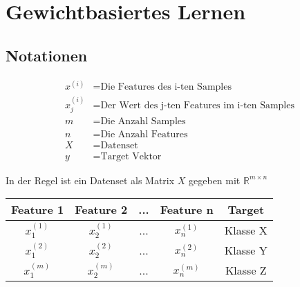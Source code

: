 \newpage
\section{Gewichtbasiertes Lernen}
\subsection{Notationen}
\begin{flushleft}

\begin{align*}
x^{(i)} &= \text{Die Features des i-ten Samples} \\
x_{j}^{(i)} &= \text{Der Wert des j-ten Features im i-ten Samples} \\
m &= \text{Die Anzahl Samples} \\
n &= \text{Die Anzahl Features} \\
X &= \text{Datenset} \\
y &= \text{Target Vektor}
\end{align*}

In der Regel ist ein Datenset als Matrix $X$ gegeben mit $\mathbb{R}^{m \times n}$


\begin{center}
	\begin{table}[h]
	\begin{tabular}{|c|c|c|c|c|}
		\hline
		\textbf{Feature 1} & \textbf{Feature 2} & \textbf{...} & \textbf{Feature n} & \textbf{Target} \\ 
		\hline
		$x_{1}^{(1)}$ & $x_{2}^{(1)}$ & ... & $x_{n}^{(1)}$ & Klasse X  \\ 
		\hline
		$x_{1}^{(2)}$ & $x_{2}^{(2)}$ & ... & $x_{n}^{(2)}$ & Klasse Y  \\ 
		\hline
		$x_{1}^{(m)}$ & $x_{2}^{(m)}$  & ... & $x_{n}^{(m)}$  & Klasse Z  \\ 
		\hline
	\end{tabular}
\end{table}
\end{center}


\end{flushleft}

\newpage
